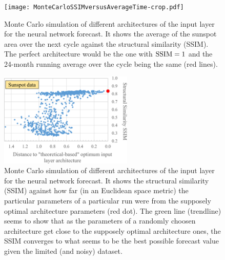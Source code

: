 \documentclass[journal]{IEEEtran}
\begin{document}
%
%
\begin{figure}[!ht]
\centering
\texttt{[image: MonteCarloSSIMversusAverageTime-crop.pdf]}
\caption{Monte Carlo simulation of different architectures of the input layer for the neural network forecast.
It shows the average of the sunspot area over the next cycle against the structural similarity (SSIM). The perfect architecture
would be the one with $\textnormal{SSIM}=1$ and the 24-month running average over the cycle being the same (red lines).}
\label{MonteCarloSSIMversusAverageTime}
\end{figure}

\begin{figure}[!ht]
\centering
\includegraphics[width=2.5in]{MonteCarloSSIMversusParameterMetricDistance-crop.pdf}
\caption{Monte Carlo simulation of different architectures of the input layer for the neural network forecast.
It shows the structural similarity (SSIM) against how far (in an Euclidean space metric) the particular parameters of a particular
run were from the supposely optimal architecture parameters (red dot). The green line (trendline) seems to show that as the parameters
of a randomly choosen architecture get close to the supposely optimal architecture ones, the SSIM converges to what seems to be the
best possible forecast value given the limited (and noisy) dataset.}
\label{MonteCarloSSIMversusParameterMetricDistance}
\end{figure}
\end{document}
